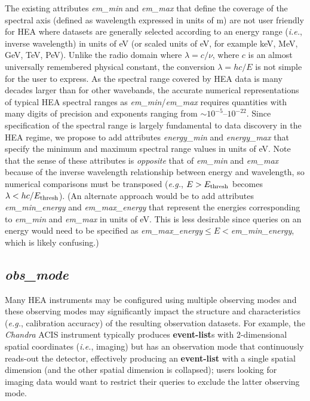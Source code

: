 \documentclass[11pt,a4paper]{ivoa}
\begin{document}
The existing attributes {\em em\_min\/} and {\em em\_max\/} that define the coverage of the spectral axis (defined as wavelength expressed in units of m) are not user friendly for \gls{HEA} where datasets are generally selected according to an energy range ({\em i.e.\/}, inverse wavelength) in units of eV (or scaled units of eV, for example keV, MeV, GeV, TeV, PeV). Unlike the radio domain where $\lambda = c/\nu$, where $c$ is an almost universally remembered physical constant, the conversion $\lambda = hc/E$ is not simple for the user to express. As the spectral range covered by \gls{HEA} data is many decades larger than for other wavebands, the accurate numerical representations of typical \gls{HEA} spectral ranges as {\em em\_min\/}/{\em em\_max\/} requires quantities with many digits of precision and exponents ranging from $\sim\!10^{-5}$--$10^{-22}$.  Since specification of the spectral range is largely fundamental to data discovery in the \gls{HEA} regime, we propose to add attributes {\em energy\_min\/} and {\em energy\_max\/} that specify the minimum and maximum spectral range values in units of eV\null. Note that the sense of these attributes is {\em opposite\/} that of {\em em\_min\/} and {\em em\_max\/} because of the inverse wavelength relationship between energy and wavelength, so numerical comparisons must be transposed ({\em e.g.\/}, $E>E_{\rm thresh}$ becomes $\lambda<hc/E_{\rm thresh}$).  (An alternate approach would be to add attributes {\em em\_min\_energy\/} and {\em em\_max\_energy\/} that represent the energies corresponding to {\em em\_min\/} and {\em em\_max\/} in units of eV\null. This is less desirable since queries on an energy would need to be specified as {\em em\_max\_energy\/}${}\leq E <{}${\em em\_min\_energy\/}, which is likely confusing.)


\subsection{{\em obs\_mode}}

Many \gls{HEA} instruments may be configured using multiple observing modes and these observing modes may significantly impact the structure and characteristics ({\em e.g.\/}, calibration accuracy) of the resulting observation datasets. For example, the {\em Chandra\/} ACIS instrument typically produces {\bf event-list}s with 2-dimensional spatial coordinates ({\em i.e.\/}, imaging) but has an observation mode that continuously reads-out the detector, effectively producing an {\bf event-list} with a single spatial dimension (and the other spatial dimension is collapsed); users looking for imaging data would want to restrict their queries to exclude the latter observing mode.
\end{document}

